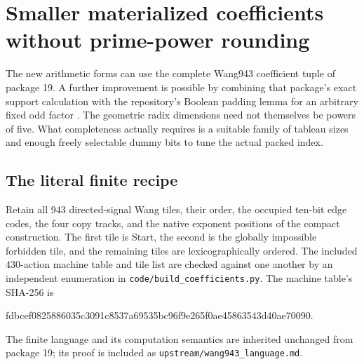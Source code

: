 \section{Smaller materialized coefficients without prime-power rounding}
\label{sec:coefficients}

The new arithmetic forms can use the complete Wang943 coefficient tuple of
package 19.  A further improvement is possible by combining that package's
exact support calculation with the repository's Boolean padding lemma for
an arbitrary fixed odd factor \cite{wang,padding}.  The geometric radix
dimensions need not themselves be powers of five.  What completeness
actually requires is a suitable family of tableau sizes and enough freely
selectable dummy bits to tune the actual packed index.

\subsection{The literal finite recipe}

Retain all 943 directed-signal Wang tiles, their order, the occupied ten-bit
edge codes, the four copy tracks, and the native exponent positions of the
compact construction.  The first tile is Start, the second is the globally
impossible forbidden tile, and the remaining tiles are lexicographically
ordered.  The included 430-action machine table and tile list are checked
against one another by an independent enumeration in
\texttt{code/build\_coefficients.py}.  The machine table's SHA-256 is
\begin{center}\small\ttfamily
fdbcef0825886035c3091c8537a69535bc96f9e265f0ae45863543d40ae70090.
\end{center}
The finite language and its computation semantics are inherited unchanged
from package 19; its proof is included as \texttt{upstream/wang943\_language.md}.

